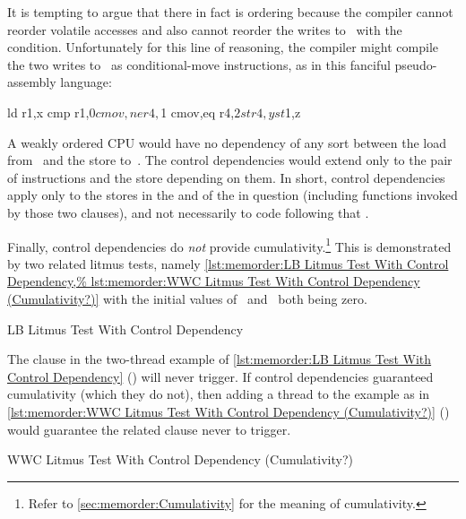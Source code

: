 It is tempting to argue that there in fact is ordering because the
compiler cannot reorder volatile accesses and also cannot reorder
the writes to~ with the condition.
Unfortunately for this line
of reasoning, the compiler might compile the two writes to~ as
conditional-move instructions, as in this fanciful pseudo-assembly
language:

\begin{VerbatimN}
ld r1,x
cmp r1,$0
cmov,ne r4,$1
cmov,eq r4,$2
st r4,y
st $1,z
\end{VerbatimN}

A weakly ordered CPU would have no dependency of any sort between the load
from~ and the store to~.
The control dependencies would extend
only to the pair of  instructions and the store depending on them.
In short, control dependencies apply only to the stores in the 
and  of the  in question (including functions invoked by
those two clauses), and not necessarily to code following that .

Finally, control dependencies do \emph{not} provide cumulativity.\footnote{
	Refer to \cref{sec:memorder:Cumulativity} for
	the meaning of cumulativity.}
This is demonstrated by two related litmus tests, namely
\cref{lst:memorder:LB Litmus Test With Control Dependency,%
lst:memorder:WWC Litmus Test With Control Dependency (Cumulativity?)}
with the initial values
of~ and~ both being zero.

\begin{listing}[tbp]

\caption{LB Litmus Test With Control Dependency}
\label{lst:memorder:LB Litmus Test With Control Dependency}
\end{listing}

The  clause in the two-thread example of
\cref{lst:memorder:LB Litmus Test With Control Dependency}
()
will never trigger.
If control dependencies guaranteed cumulativity (which they do
not), then adding a thread to the example as in
\cref{lst:memorder:WWC Litmus Test With Control Dependency (Cumulativity?)}
()
would guarantee the related  clause never to trigger.

\begin{listing}

\caption{WWC Litmus Test With Control Dependency (Cumulativity?)}
\label{lst:memorder:WWC Litmus Test With Control Dependency (Cumulativity?)}
\end{listing}

